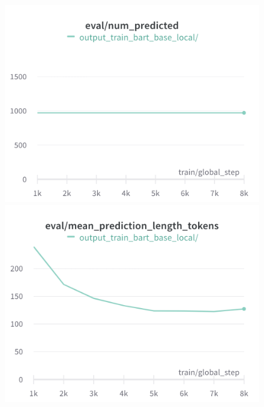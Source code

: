 \documentclass{article}
\begin{document}
\begin{figure}[!htb]
\includegraphics[width=\linewidth]{charts/Section-4-Panel-2-7v9p2n6qw}
\caption{}
\endminipage\hfill
{}
\includegraphics[width=\linewidth]{charts/Section-4-Panel-3-d4b23g8ks}
\caption{}
\endminipage
\end{figure}
\end{document}
